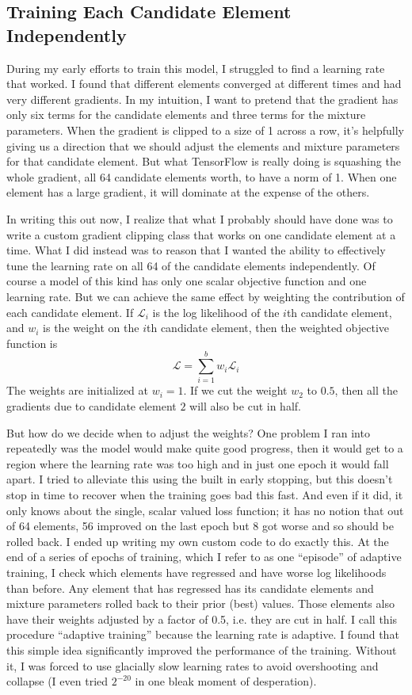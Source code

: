\subsection{Training Each Candidate Element Independently}
During my early efforts to train this model, I struggled to find a learning rate that worked.
I found that different elements converged at different times and had very different gradients.
In my intuition, I want to pretend that the gradient has only six terms for the candidate elements and three terms for the mixture parameters.
When the gradient is clipped to a size of 1 across a row, 
it's helpfully giving us a direction that we should adjust the elements and mixture parameters for that candidate element.
But what TensorFlow is really doing is squashing the whole gradient, all 64 candidate elements worth, to have a norm of 1.
When one element has a large gradient, it will dominate at the expense of the others.

In writing this out now, I realize that what I probably should have done was to write a custom gradient clipping class that works on one candidate element at a time.
What I did instead was to reason that I wanted the ability to effectively tune the learning rate on all 64 of the candidate elements independently.
Of course a model of this kind has only one scalar objective function and one learning rate.
But we can achieve the same effect by weighting the contribution of each candidate element.
If $\mathcal{L}_i$ is the log likelihood of the $i$th candidate element, and $w_i$ is the weight on the $i$th candidate element,  
then the weighted objective function is 
$$\mathcal{L} = \sum_{i=1}^{b} w_i \mathcal{L}_i$$
The weights are initialized at $w_i=1$.  If we cut the weight $w_2$ to $0.5$, then all the gradients due to candidate element $2$ will also be cut in half.

But how do we decide when to adjust the weights?
One problem I ran into repeatedly was the model would make quite good progress, 
then it would get to a region where the learning rate was too high and in just one epoch it would fall apart.
I tried to alleviate this using the built in early stopping, but this doesn't stop in time to recover when the training goes bad this fast.
And even if it did, it only knows about the single, scalar valued loss function;
it has no notion that out of 64 elements, 56 improved on the last epoch but 8 got worse and so should be rolled back.
I ended up writing my own custom code to do exactly this.
At the end of a series of epochs of training, which I refer to as one ``episode'' of adaptive training,
I check which elements have regressed and have worse log likelihoods than before.
Any element that has regressed has its candidate elements and mixture parameters rolled back to their prior (best) values.
Those elements also have their weights adjusted by a factor of 0.5, i.e. they are cut in half.
I call this procedure ``adaptive training'' because the learning rate is adaptive.
I found that this simple idea significantly improved the performance of the training.
Without it, I was forced to use glacially slow learning rates to avoid overshooting and collapse (I even tried $2^{-20}$ in one bleak moment of desperation).

